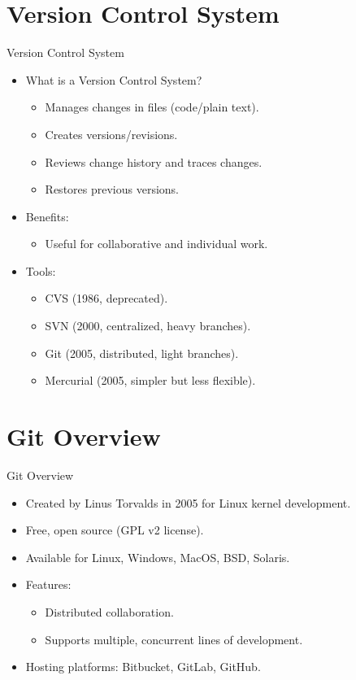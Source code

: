 \section{Version Control System}
\begin{frame}{Version Control System}
  \begin{itemize}
    \item What is a Version Control System?
    \begin{itemize}
      \item Manages changes in files (code/plain text).
      \item Creates versions/revisions.
      \item Reviews change history and traces changes.
      \item Restores previous versions.
    \end{itemize}
    \item Benefits:
    \begin{itemize}
      \item Useful for collaborative and individual work.
    \end{itemize}
    \item Tools:
    \begin{itemize}
      \item CVS (1986, deprecated).
      \item SVN (2000, centralized, heavy branches).
      \item Git (2005, distributed, light branches).
      \item Mercurial (2005, simpler but less flexible).
    \end{itemize}
  \end{itemize}
\end{frame}

\section{Git Overview}
\begin{frame}{Git Overview}
  \begin{itemize}
    \item Created by Linus Torvalds in 2005 for Linux kernel development.
    \item Free, open source (GPL v2 license).
    \item Available for Linux, Windows, MacOS, BSD, Solaris.
    \item Features:
    \begin{itemize}
      \item Distributed collaboration.
      \item Supports multiple, concurrent lines of development.
    \end{itemize}
    \item Hosting platforms: Bitbucket, GitLab, GitHub.
  \end{itemize}
\end{frame}

